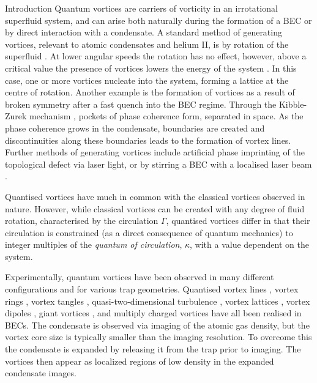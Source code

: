 \begin{chapter}{\label{cha:bose_gases}Introduction}
Quantum vortices are carriers of vorticity in an irrotational superfluid system, and can arise both naturally during the formation of a BEC or by direct interaction with a condensate. A standard method of generating vortices, relevant to atomic condensates and helium II, is by rotation of the superfluid \cite{PhysRevLett.43.214,PhysRevLett.84.806,hodby_2002,Abo-Shaeer476, PhysRevLett.87.210403}. At lower angular speeds the rotation has no effect, however, above a critical value the presence of vortices lowers the energy of the system \cite{0953-8984-13-12-201,NozieresPines}. In this case, one or more vortices nucleate into the system, forming a lattice \cite{PhysRevLett.43.214,Abo-Shaeer476} at the centre of rotation. Another example is the formation of vortices as a result of broken symmetry after a fast quench into the BEC regime. Through the Kibble-Zurek mechanism \cite{0305-4470-9-8-029,Zurek85,KZvort99}, pockets of phase coherence form, separated in space. As the phase coherence grows in the condensate, boundaries are created and discontinuities along these boundaries leads to the formation of vortex lines. Further methods of generating vortices include artificial phase imprinting \cite{Cornell99,Dobrek99,Leanhardt99} of the topological defect via laser light, or by stirring a BEC with a localised laser beam \cite{PhysRevLett.84.806,hodby_2002,Abo-Shaeer476,jma00,Raman01,Inouye}.

Quantised vortices have much in common with the classical vortices observed in nature. However, while classical vortices can be created with any degree of fluid rotation, characterised by the circulation $\Gamma$, quantised vortices differ in that their circulation is constrained (as a direct consequence of quantum mechanics) to integer multiples of the {\it quantum of circulation}, $\kappa$, with a value dependent on the system.

Experimentally, quantum vortices have been observed in many different configurations and for various trap geometries. Quantised vortex lines \cite{Dutton27072001}, vortex rings \cite{PhysRevLett.86.2926}, vortex tangles \cite{Henn}, quasi-two-dimensional turbulence \cite{kwon_moon_14}, vortex lattices \cite{PhysRevLett.84.806,Abo-Shaeer476,abo_shaeer_2002,PhysRevLett.86.4443}, vortex dipoles \cite{Neely}, giant vortices \cite{PhysRevLett.90.170405}, and multiply charged vortices \cite{PhysRevLett.93.160406} have all been realised in BECs. The condensate is observed via imaging of the atomic gas density, but the vortex core size is typically smaller than the imaging resolution. To overcome this the condensate is expanded by releasing it from the trap prior to imaging. The vortices then appear as localized regions of low density in the expanded condensate images.


\end{chapter}
